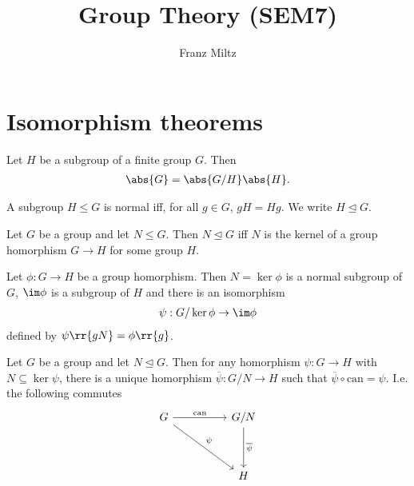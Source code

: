 \documentclass{article}
\begin{document}
\mkthmstwounified
\title{Group Theory (SEM7)}
\author{Franz Miltz}
\maketitle
\tableofcontents
\pagebreak

\section{Isomorphism theorems}
\label{sec:isomorphism-theorems}

\begin{theorem}[Lagrange]
  \label{thm}
  Let $H$ be a subgroup of a finite group $G$. Then
  \begin{align*}
    \abs{G}=\abs{G/H}\abs{H}.
  \end{align*}
\end{theorem}

\begin{definition}
  \label{def:normal-subgroup}
  A subgroup $H\leq G$ is normal iff, for all $g\in G$, $gH=Hg$. We write $H\trianglelefteq G$.
\end{definition}

\begin{theorem}
  Let $G$ be a group and let $N\leq G$. Then $N\trianglelefteq G$ iff $N$ is the kernel
  of a group homorphism $G\to H$ for some group $H$.
\end{theorem}

\begin{theorem}
  \label{thm:first-iso-theorem}
  Let $\phi:G\to H$ be a group homorphism. Then $N=\ker\phi$ is a normal subgroup of
  $G$, $\im\phi$ is a subgroup of $H$ and there is an isomorphism
  \begin{align*}
    \psi : G/\ker\phi \to \im\phi
  \end{align*}
  defined by $\psi\rr{gN}=\phi\rr{g}$.
\end{theorem}

\begin{theorem}
  \label{thm:up-factor-groups}
  Let $G$ be a group and let $N\trianglelefteq G$. Then for any homorphism $\psi:G\to H$
  with $N\subseteq\ker\psi$, there is a unique homorphism $\overline\psi:G/N\to H$ such
  that $\overline\psi\circ\text{can}=\psi$. I.e. the following commutes
  \begin{equation}
    \begin{tikzcd}[row sep=huge, column sep=huge]
      G \arrow{r}{\text{can}} \arrow{dr}{\psi} & G/N \arrow{d}{\overline\psi} \\
                                               & H
    \end{tikzcd}
  \end{equation}
\end{theorem}
\end{document}
